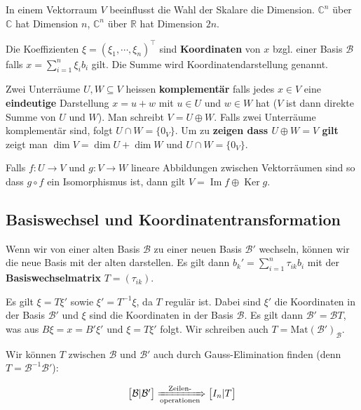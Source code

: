 \documentclass[a4paper,10pt]{article}
\def\R{\mathbb{R}}
\def\C{\mathbb{C}}
\begin{document}
In einem Vektorraum $V$ beeinflusst die Wahl der Skalare die Dimension. $\C^n$ über $\C$ hat Dimension $n$, $\C^n$ über $\R$ hat Dimension $2n$.

Die Koeffizienten $\xi = (\xi_1, \cdots, \xi_n)^\top$ sind \textbf{Koordinaten} von $x$ bzgl. einer Basis $\mathcal{B}$ falls $x = \sum_{i=1}^n \xi_i b_i$ gilt. Die Summe wird Koordinatendarstellung genannt.

Zwei Unterräume $U, W \subseteq V$ heissen \textbf{komplementär} falls jedes $x \in V$ eine \textbf{eindeutige} Darstellung $x = u + w$ mit $u \in U$ und $w \in W$ hat ($V$ ist dann direkte Summe von $U$ und $W$). Man schreibt $V = U \oplus W$. Falls zwei Unterräume komplementär sind, folgt $U \cap W = \{0_V\}$. Um zu \textbf{zeigen dass $U \oplus W = V$ gilt} zeigt man $\dim V = \dim U + \dim W$ und $U \cap W = \{0_V\}$.

Falls  $f: U \rightarrow V$ und $g: V \rightarrow W$ lineare Abbildungen zwischen Vektorräumen sind so dass $ g \circ f$ ein Isomorphismus ist, dann gilt $V = \operatorname{Im}f \oplus \operatorname{Ker} g$.

\subsection{Basiswechsel und Koordinatentransformation}

Wenn wir von einer alten Basis $\mathcal{B}$ zu einer neuen Basis $\mathcal{B}'$ wechseln, können wir die neue Basis mit der alten darstellen. Es gilt dann $b_k' = \sum_{i=1}^n \tau_{ik} b_i$ mit der \textbf{Basiswechselmatrix} $T = (\tau_{ik})$.

Es gilt $\xi = T \xi'$ sowie $\xi' = T^{-1} \xi$, da $T$ regulär ist. Dabei sind $\xi'$ die Koordinaten in der Basis $\mathcal{B}'$ und $\xi$ sind die Koordinaten in der Basis $\mathcal{B}$. Es gilt dann $\mathcal{B}' = \mathcal{B} T$, was aus $B \xi = x = B' \xi'$ und $\xi = T \xi'$ folgt. Wir schreiben auch $T = \text{Mat}(\mathcal{B'})_{\mathcal{B}}$.

Wir können $T$ zwischen $\mathcal{B}$ und $\mathcal{B}'$ auch durch Gauss-Elimination finden (denn $T = \mathcal{B}^{-1} \mathcal{B'}$):

$$\begin{bmatrix*}
  \mathcal{B} | \mathcal{B}'
\end{bmatrix*} \xRightarrow[\text{operationen}]{\text{Zeilen-}} \begin{bmatrix*}
  I_n | T
\end{bmatrix*}$$
\end{document}
